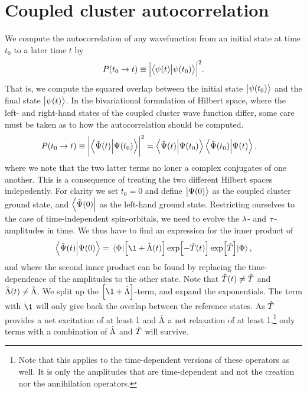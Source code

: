 \chapter{Coupled cluster autocorrelation}
    We compute the autocorrelation of any wavefunction from an initial state at
    time $t_0$ to a later time $t$ by
    \begin{align}
        P(t_0 \to t)
        \equiv \abs{\braket{\psi(t)}{\psi(t_0)}}^2.
    \end{align}
    That is, we compute the squared overlap between the initial state
    $\ket{\psi(t_0)}$ and the final state $\ket{\psi(t)}$.
    In the bivariational formulation of Hilbert space, where the left- and
    right-hand states of the coupled cluster wave function differ, some care
    must be taken as to how the autocorrelation should be computed.
    \begin{align}
        P(t_0 \to t)
        &\equiv \abs{\braket{\tilde{\Psi}(t)}{\Psi(t_0)}}^2
        = \braket{\tilde{\Psi}(t)}{\Psi(t_0)}
        \braket{\tilde{\Psi}(t_0)}{\Psi(t)},
    \end{align}
    where we note that the two latter terms no loner a complex conjugates of one
    another.
    This is a consequence of treating the two different Hilbert spaces
    indepedently.
    For clarity we set $t_0 = 0$ and define $\ket{\Psi(0)}$ as the coupled
    cluster ground state, and $\bra{\tilde{\Psi}(0)}$ as the left-hand ground
    state.
    Restricting ourselves to the case of time-independent spin-orbitals, we need
    to evolve the $\lambda$- and $\tau$-amplitudes in time.
    We thus have to find an expression for the inner product of
    \begin{gather}
        \braket{\tilde{\Psi}(t)}{\Psi(0)}
        =
        \mel{\slat}{
            \brak{\1 + \clustl(t)}
            \exp[-\clust(t)]
            \exp[\clust]
        }{\slat},
    \end{gather}
    and where the second inner product can be found by replacing the
    time-dependence of the amplitudes to the other state.
    Note that $\hat{T}(t) \neq \hat{T}$ and $\hat{\Lambda}(t) \neq \hat{\Lambda}$.
    We split up the $\brak{\1 + \clustl}$-term, and expand the exponentials.
    The term with $\1$ will only give back the overlap between the reference
    states.
    As $\hat{T}$ provides a net excitation of at least $1$ and $\hat{\Lambda}$ a net
    relaxation of at least $1$,\footnote{
        Note that this applies to the time-dependent versions
        of these operators as well. It is only the amplitudes that are
        time-dependent and not the creation nor the annihilation operators.
    } only terms with a combination of $\hat{\Lambda}$ and $\hat{T}$ will survive.
